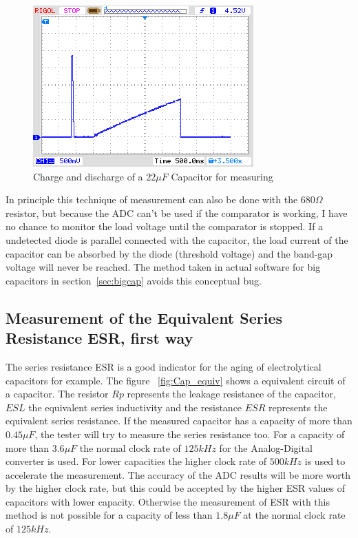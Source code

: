 \begin{figure}[H]
  \centering
    \includegraphics[]{../PNG/charge_22uF.png}
  \caption{Charge and discharge of a \(22\mu F\) Capacitor for measuring}
  \label{pic:c22uF}
\end{figure}


In principle this technique of measurement can also be done with the \(680\Omega\) resistor, but 
because the ADC can't be used if the comparator is working, I have no chance to monitor the
load voltage until the comparator is stopped. If a undetected diode is parallel connected with
the capacitor, the load current of the capacitor can be absorbed by the diode (threshold voltage) and
the band-gap voltage will never be reached.
The method taken in actual software for big capacitors in section~\ref{sec:bigcap}
avoids this conceptual bug.

\subsection{Measurement of the Equivalent Series Resistance ESR, first way}
The series resistance ESR \cite{ESR} is a good indicator for the aging of electrolytical capacitors for example.
The figure ~\ref{fig:Cap_equiv} shows a equivalent circuit of a capacitor.
The resistor \(Rp\) represents the leakage resistance of the capacitor, \(ESL\) the equivalent series inductivity and
the resistance \(ESR\) represents the equivalent series resistance.
If the measured capacitor has a capacity of more than \(0.45 \mu F\), the tester will try to measure
the series resistance too.
For a capacity of more than \(3.6 \mu F\) the normal clock rate of \(125 kHz\) for the Analog-Digital converter is used.
For lower capacities the higher clock rate of \(500 kHz\) is used to accelerate the measurement.
The accuracy of the ADC results will be more worth by the higher clock rate, but this could be accepted by the
higher ESR values of capacitors with lower capacity.
Otherwise the measurement of ESR with this method is not possible for a capacity of less than \(1.8 \mu F\) at the normal
clock rate of \(125 kHz\).

